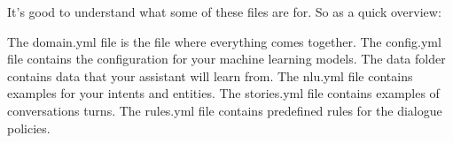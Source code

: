 It's good to understand what some of these files are for. So as a quick overview:

The domain.yml file is the file where everything comes together.
The config.yml file contains the configuration for your machine learning models.
The data folder contains data that your assistant will learn from.
The nlu.yml file contains examples for your intents and entities.
The stories.yml file contains examples of conversations turns.
The rules.yml file contains predefined rules for the dialogue policies.